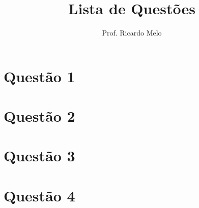 \documentclass[a4paper,12pt]{article}
\title{Lista de Questões}
\author{Prof. Ricardo Melo}
\date{} %
\begin{document}

\begin{multicols}{2}
\section*{Questão 1}
\lipsum[1]

\section*{Questão 2}
\lipsum[2]

\section*{Questão 3}
\lipsum[3]

\section*{Questão 4}
\lipsum[4]
\end{multicols}
\end{document}
